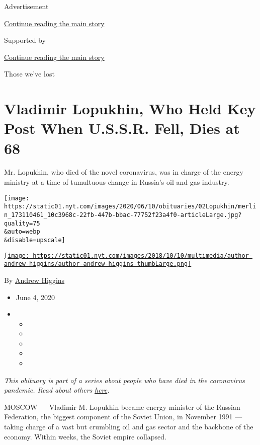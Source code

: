 Advertisement

\protect\hyperlink{after-top}{Continue reading the main story}

Supported by

\protect\hyperlink{after-sponsor}{Continue reading the main story}

Those we've lost

\hypertarget{vladimir-lopukhin-who-held-key-post-when-ussr-fell-dies-at-68}{%
\section{Vladimir Lopukhin, Who Held Key Post When U.S.S.R. Fell, Dies
at
68}\label{vladimir-lopukhin-who-held-key-post-when-ussr-fell-dies-at-68}}

Mr. Lopukhin, who died of the novel coronavirus, was in charge of the
energy ministry at a time of tumultuous change in Russia's oil and gas
industry.

\texttt{[image: https://static01.nyt.com/images/2020/06/10/obituaries/02Lopukhin/merlin\_173110461\_10c3968c-22fb-447b-bbac-77752f23a4f0-articleLarge.jpg?quality=75\\\&auto=webp\\\&disable=upscale]}

\href{https://www.nytimes.com/by/andrew-higgins}{\texttt{[image: https://static01.nyt.com/images/2018/10/10/multimedia/author-andrew-higgins/author-andrew-higgins-thumbLarge.png]}}

By \href{https://www.nytimes.com/by/andrew-higgins}{Andrew Higgins}

\begin{itemize}
\item
  June 4, 2020
\item
  \begin{itemize}
  \item
  \item
  \item
  \item
  \item
  \end{itemize}
\end{itemize}

\emph{This obituary is part of a series about people who have died in
the coronavirus pandemic. Read about others}
\href{https://www.nytimes.com/interactive/2020/obituaries/people-died-coronavirus-obituaries.html}{\emph{here}}\emph{.}

MOSCOW --- Vladimir M. Lopukhin became energy minister of the Russian
Federation, the biggest component of the Soviet Union, in November 1991
--- taking charge of a vast but crumbling oil and gas sector and the
backbone of the economy. Within weeks, the Soviet empire collapsed.

